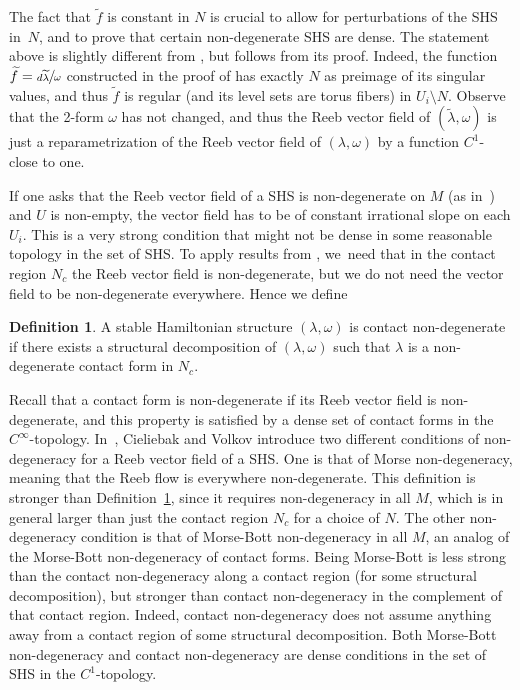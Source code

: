 \documentclass[JEP,XML,SOM,Unicode,NoEqCountersInSection,NoFloatCountersInSection,published]{cedram}
\theoremstyle{definition}
\newtheorem{defi}[theorem]{Definition}
\begin{document}
The fact that $\widetilde f$ is constant in $N$ is crucial to allow for perturbations of the SHS in~$N$, and to prove that certain non-degenerate SHS are dense. The statement above is slightly different from \cite[Th.\,4.1]{CV1}, but follows from its proof. Indeed, the function $\widetilde f=\sfrac{d\widetilde \lambda}{\omega}$ constructed in the proof of \cite[Th.\,4.1]{CV1} has exactly $N$ as preimage of its singular values, and thus $\tilde f$ is regular (and its level sets are torus fibers) in $U_i\setminus N$. Observe that the 2-form $\omega$ has not changed, and thus the Reeb vector field of $(\widetilde \lambda,\omega)$ is just a reparametrization of the Reeb vector field of $(\lambda,\omega)$ by a function $C^1$-close to one.

If one asks that the Reeb vector field of a SHS is non-degenerate on $M$ (\eg as in~\cite{MS}) and $U$ is non-empty, the vector field has to be of constant irrational slope on each $U_i$. This is a very strong condition that might not be dense in some reasonable topology in the set of SHS. To apply results from \cite{CDR}, we~need that in the contact region $N_c$ the Reeb vector field is non-degenerate, but we do not need the vector field to be non-degenerate everywhere. Hence we define

\begin{defi}\label{def:contactND}
A stable Hamiltonian structure $(\lambda,\omega)$ is contact non-degenerate if there exists a structural decomposition of $(\lambda,\omega)$ such that $\lambda$ is a non-degenerate contact form in $N_c$.
\end{defi}

Recall that a contact form is non-degenerate if its Reeb vector field is non-degenerate, and this property is satisfied by a dense set of contact forms in the $C^\infty$-topology. In~\cite[p.\,375]{CV1}, Cieliebak and Volkov introduce two different conditions of non-degeneracy for a Reeb vector field of a SHS. One is that of Morse non-degeneracy, meaning that the Reeb flow is everywhere non-degenerate. This definition is stronger than Definition~\ref{def:contactND}, since it requires non-degeneracy in all $M$, which is in general larger than just the contact region $N_c$ for a choice of $N$. The other non-degeneracy condition is that of Morse-Bott non-degeneracy in all $M$, an analog of the Morse-Bott non-degeneracy of contact forms. Being Morse-Bott is less strong than the contact non-degeneracy along a contact region (for some structural decomposition), but stronger than contact non-degeneracy in the complement of that contact region. Indeed, contact non-degeneracy does not assume anything away from a contact region of some structural decomposition. Both Morse-Bott non-degeneracy and contact non-degeneracy are dense conditions in the set of SHS in the $C^1$-topology.
\end{document}
